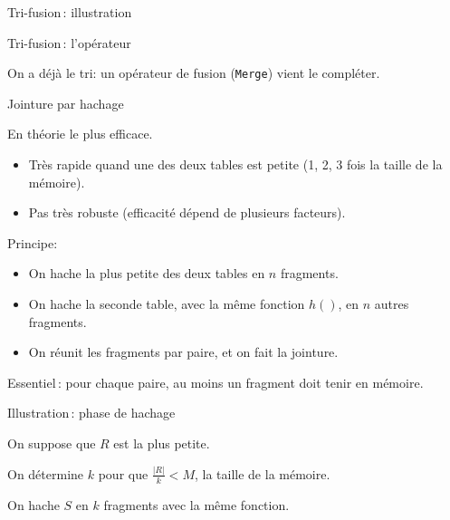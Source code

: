\begin{frame}{Tri-fusion\,: illustration}


\end{frame}


\begin{frame}{Tri-fusion\,: l'opérateur}

On a déjà le tri: un opérateur de fusion (\texttt{Merge}) vient le compléter.



\end{frame}

\begin{frame}{Jointure par hachage}

En théorie le plus efficace.

\begin{itemize}

  \item Très rapide quand
         une des deux tables est petite (1, 2, 3 fois
           la taille de la mémoire).

   \item Pas très robuste (efficacité dépend de plusieurs
      facteurs).
\end{itemize}

\vfill

Principe:
\begin{itemize}

  \item On hache la plus petite des deux tables en $n$ fragments.

  \item On hache la seconde table, avec la même fonction $h()$, 
             en $n$ autres fragments.

  \item On réunit les fragments par paire, et on fait la jointure.
\end{itemize}

\alert{Essentiel}\,: pour chaque paire, au moins un fragment
doit tenir en mémoire.

\end{frame}
\begin{frame}{Illustration\,: phase de hachage}

On suppose que $R$ est la plus petite.  

\vfill

On détermine $k$ pour que
$\frac{|R|}{k} < M$, la taille de la mémoire.

\vfill


\vfill

On hache $S$ en $k$ fragments avec la même fonction.

\end{frame}

